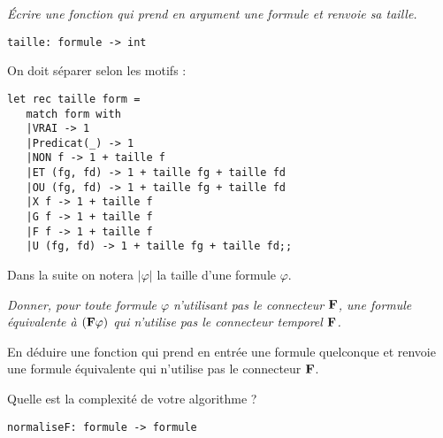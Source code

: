 \begin{Exercise}\it
Écrire une fonction  qui prend en argument une formule et renvoie sa taille. 
\begin{lstlisting}
taille: formule -> int
\end{lstlisting}
\end{Exercise}
\begin{Answer}
On doit séparer selon les motifs :
\begin{lstlisting}
let rec taille form = 
   match form with 
   |VRAI -> 1
   |Predicat(_) -> 1
   |NON f -> 1 + taille f
   |ET (fg, fd) -> 1 + taille fg + taille fd
   |OU (fg, fd) -> 1 + taille fg + taille fd
   |X f -> 1 + taille f
   |G f -> 1 + taille f 
   |F f -> 1 + taille f
   |U (fg, fd) -> 1 + taille fg + taille fd;;
\end{lstlisting} 
Dans la suite on notera $|\varphi|$ la taille d'une formule $\varphi$.
\end{Answer}
\begin{Exercise}\it
Donner, pour toute formule $\varphi$ n'utilisant pas le connecteur ${\bf F}$, une formule équivalente à $({\bf F}\varphi)$ qui n'utilise pas le connecteur temporel ${\bf F}$. 

En déduire une fonction  qui prend en entrée une formule quelconque et renvoie une formule équivalente qui n'utilise pas le connecteur ${\bf F}$. 

Quelle est la complexité de votre algorithme ?
\begin{lstlisting}
normaliseF: formule -> formule
\end{lstlisting}
\end{Exercise}

